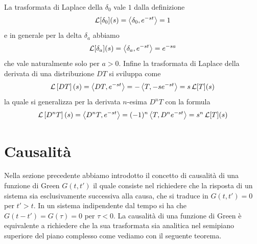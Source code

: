 La trasformata di Laplace della $ \delta_0 $ vale $ 1 $ dalla definizione
\begin{align}
  \operatorname{\mathcal{L}}[\delta_0](s) = \left< \delta_0, e^{-st} \right> = 1
\end{align}
e in generale per la delta $ \delta_a $ abbiamo
\begin{align}
  \operatorname{\mathcal{L}}[\delta_a](s) = \left< \delta_a, e^{-st} \right> = e^{-sa}
\end{align}
che vale naturalmente solo per $ a > 0 $. Infine la trasformata di Laplace della derivata di una distribuzione $ DT $ si sviluppa come 
\begin{align}
  \operatorname{\mathcal{L}}\left[ DT \right](s) = \left< DT, e^{-st} \right> = - \left< T, -se^{-st} \right> = s\operatorname{\mathcal{L}}[T](s)
\end{align}
la quale si generalizza per la derivata $ n $-esima $ D^nT $ con la formula 
\begin{align}
  \operatorname{\mathcal{L}}\left[ D^nT \right](s) = \left< D^nT, e^{-st} \right> = (-1)^n \left< T, D^n e^{-st} \right> = s^n \operatorname{\mathcal{L}}[T](s)
\end{align}

\section{Causalità}

Nella sezione precedente abbiamo introdotto il concetto di causalità di una funzione di Green $ G(t,t') $ il quale consiste nel richiedere che la 
risposta di un sistema sia esclusivamente successiva alla causa, che si traduce in $ G(t,t') = 0 $ per $ t' > t $. In un sistema indipendente dal tempo 
si ha che $ G(t - t') = G(\tau) = 0 $ per $ \tau < 0 $. La causalità di una funzione di Green è equivalente a richiedere che la sua trasformata sia 
analitica nel semipiano superiore del piano complesso come vediamo con il seguente teorema. 

